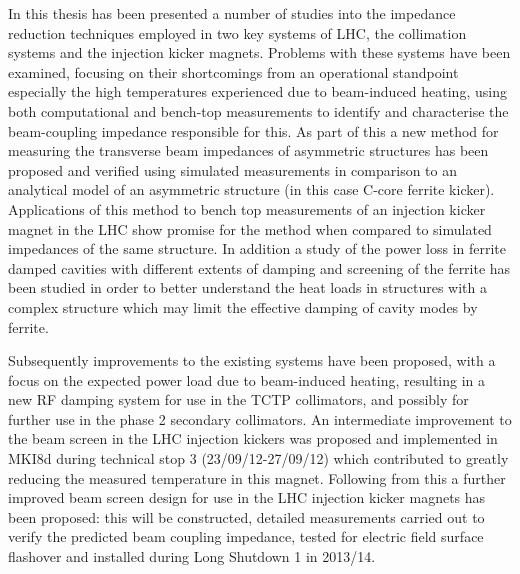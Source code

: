 \label{chap:Con}

In this thesis has been presented a number of studies into the impedance reduction techniques employed in two key systems of LHC, the collimation systems and the injection kicker magnets. Problems with these systems have been examined, focusing on their shortcomings from an operational standpoint especially the high temperatures experienced due to beam-induced heating, using both computational and bench-top measurements to identify and characterise the beam-coupling impedance responsible for this. As part of this a new method for measuring the transverse beam impedances of asymmetric structures has been proposed and verified using simulated measurements in comparison to an analytical model of an asymmetric structure (in this case C-core ferrite kicker). Applications of this method to bench top measurements of an injection kicker magnet in the LHC show promise for the method when compared to simulated impedances of the same structure. In addition a study of the power loss in ferrite damped cavities with different extents of damping and screening of the ferrite has been studied in order to better understand the heat loads in structures with a complex structure which may limit the effective damping of cavity modes by ferrite.

Subsequently improvements to the existing systems have been proposed, with a focus on the expected power load due to beam-induced heating, resulting in a new RF damping system for use in the TCTP collimators, and possibly for further use in the phase 2 secondary collimators. An intermediate improvement to the beam screen in the LHC injection kickers was proposed and implemented in MKI8d during technical stop 3 (23/09/12-27/09/12) which contributed to greatly reducing the measured temperature in this magnet. Following from this a further improved beam screen design for use in the LHC injection kicker magnets has been proposed: this will be constructed, detailed measurements carried out to verify the predicted beam coupling impedance, tested for electric field surface flashover and installed during Long Shutdown 1 in 2013/14.

